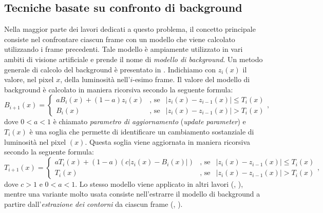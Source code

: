 \subsection{Tecniche basate su confronto di background}
Nella maggior parte dei lavori dedicati a questo problema, il concetto principale consiste nel confrontare ciascun frame con un modello che viene calcolato utilizzando i frame precedenti.
Tale modello \`e ampiamente utilizzato in vari ambiti di visione artificiale e prende il nome di \textit{modello di background}.
Un metodo generale di calcolo del background \`e presentato in \cite{aksay2007camera}.
Indichiamo con $z_i(x)$ il valore, nel pixel $x$, della luminosit\`a nell'$i$-esimo frame.
Il valore del modello di background \`e calcolato in maniera ricorsiva secondo la seguente formula:
\begin{equation}
\label{eq:background}
B_{i + 1}(x)=\left\{ \begin{array} {lcl}
aB_i(x)+ (1-a)z_i(x) & \mbox{, se} & |z_i(x) - z_{i-1}(x)|\leq T_i(x) \\
B_i(x) & \mbox{, se} & |z_i(x) - z_{i-1}(x)|>T_i(x)\end{array} \right. ,
\end{equation}
dove $0 < a < 1$ \`e chiamato \textit{parametro di aggiornamento} (\textit{update parameter}) e $T_i(x)$ \`e una soglia che permette di identificare un cambiamento sostanziale di luminosit\`a nel pixel $(x)$. 
 Questa soglia viene aggiornata in maniera ricorsiva secondo la seguente formula:
  \begin{equation}
  \label{eq:backgroundThreshUpd}
  T_{i + 1}(x)=\left\{ \begin{array} {lcl}
  aT_i(x)+ (1-a)(c |z_i(x) - B_i(x)|) & \mbox{, se} & |z_i(x) - z_{i-1}(x)|\leq T_i(x) \\
  T_i(x) & \mbox{, se} & |z_i(x) - z_{i-1}(x)|>T_i(x) \end{array} \right. ,
  \end{equation}
  dove $c > 1$ e $0<a<1$.
  Lo stesso modello viene applicato in altri lavori (\cite{saglam2009real}, \cite{tsesmelis2013tamper}), mentre una variante molto usata consiste nell'estrarre il modello di background a partire dall'\textit{estrazione dei contorni} da ciascun frame (\cite{harasse2004automated}, \cite{gil2007automatic}).
